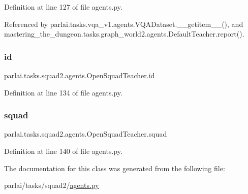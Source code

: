 Definition at line 127 of file agents.\+py.



Referenced by parlai.\+tasks.\+vqa\+\_\+v1.\+agents.\+V\+Q\+A\+Dataset.\+\_\+\+\_\+getitem\+\_\+\+\_\+(), and mastering\+\_\+the\+\_\+dungeon.\+tasks.\+graph\+\_\+world2.\+agents.\+Default\+Teacher.\+report().

\mbox{\label{classparlai_1_1tasks_1_1squad2_1_1agents_1_1OpenSquadTeacher_afee4b62658417abd64ef8bd57bbf6620}} 
\subsubsection{\texorpdfstring{id}{id}}
{\footnotesize\ttfamily parlai.\+tasks.\+squad2.\+agents.\+Open\+Squad\+Teacher.\+id}



Definition at line 134 of file agents.\+py.

\mbox{\label{classparlai_1_1tasks_1_1squad2_1_1agents_1_1OpenSquadTeacher_a80a634305ad2a0af202031e430ddf3af}} 
\subsubsection{\texorpdfstring{squad}{squad}}
{\footnotesize\ttfamily parlai.\+tasks.\+squad2.\+agents.\+Open\+Squad\+Teacher.\+squad}



Definition at line 140 of file agents.\+py.



The documentation for this class was generated from the following file\+:\begin{DoxyCompactItemize}
\item 
parlai/tasks/squad2/\hyperlink{parlai_2tasks_2squad2_2agents_8py}{agents.\+py}\end{DoxyCompactItemize}
